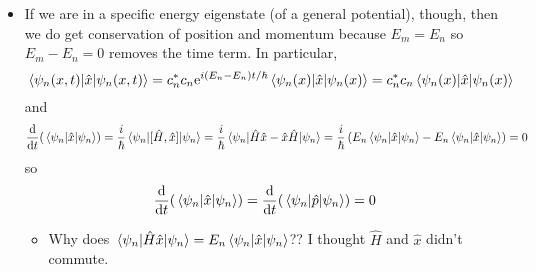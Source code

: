 \documentclass[../notes.tex]{subfiles}
\begin{document}
\begin{itemize}
\begin{itemize}
        \item If we are in a specific energy eigenstate (of a general potential), though, then we do get conservation of position and momentum because $E_m=E_n$ so $E_m-E_n=0$ removes the time term. In particular,
        \begin{equation*}
            \ev{\hat{x}}{\psi_n(x,t)} = c_n^*c_n\e[i(E_n-E_n)t/\hbar]\ev{\hat{x}}{\psi_n(x)}= c_n^*c_n\ev{\hat{x}}{\psi_n(x)}
        \end{equation*}
        and
        \begin{equation*}
            \dv{t}(\ev{\hat{x}}{\psi_n}) = \frac{i}{\hbar}\ev{[\hat{H},\hat{x}]}{\psi_n}
            = \frac{i}{\hbar}\ev{\hat{H}\hat{x}-\hat{x}\hat{H}}{\psi_n}
            = \frac{i}{\hbar}\left( E_n\ev{\hat{x}}{\psi_n}-E_n\ev{\hat{x}}{\psi_n} \right)
            = 0
        \end{equation*}
        so
        \begin{equation*}
            \dv{t}(\ev{\hat{x}}{\psi_n}) = \dv{t}(\ev{\hat{p}}{\psi_n})
            = 0
        \end{equation*}
        \begin{itemize}
            \item Why does $\ev{\hat{H}\hat{x}}{\psi_n}=E_n\ev{\hat{x}}{\psi_n}$?? I thought $\hat{H}$ and $\hat{x}$ didn't commute.
        \end{itemize}
    \end{itemize}
\end{itemize}
\end{document}
